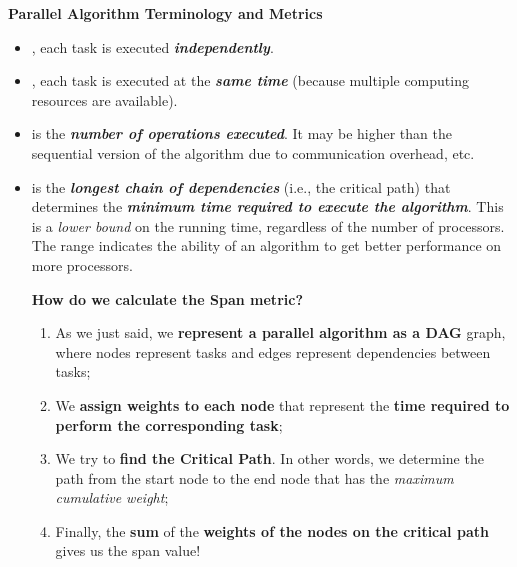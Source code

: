 \highspace
\begin{flushleft}
    \textcolor{Red2}{ \textbf{Parallel Algorithm Terminology and Metrics}}
\end{flushleft}
\begin{itemize}
    \item {}, each task is executed \emph{\textbf{independently}}.
    
    \item {}, each task is executed at the \emph{\textbf{same time}} (because multiple computing resources are available).
    
    \item {} is the \emph{\textbf{number of operations executed}}. It may be higher than the sequential version of the algorithm due to communication overhead, etc.
    
    \item {} is the \emph{\textbf{longest chain of dependencies}} (i.e., the critical path) that determines the \emph{\textbf{minimum time required to execute the algorithm}}. This is a \emph{lower bound} on the running time, regardless of the number of processors. The range indicates the ability of an algorithm to get better performance on more processors.
    \begin{flushleft}
        \textcolor{Green3}{ \textbf{How do we calculate the Span metric?}}
    \end{flushleft}
    \begin{enumerate}
        \item As we just said, we \textbf{represent a parallel algorithm as a DAG} graph, where nodes represent tasks and edges represent dependencies between tasks;
        \item We \textbf{assign weights to each node} that represent the \textbf{time required to perform the corresponding task};
        \item We try to \textbf{find the Critical Path}. In other words, we determine the path from the start node to the end node that has the \emph{maximum cumulative weight};
        \item Finally, the \textbf{sum} of the \textbf{weights of the nodes on the critical path} gives us the span value!
    \end{enumerate}


\end{itemize}
